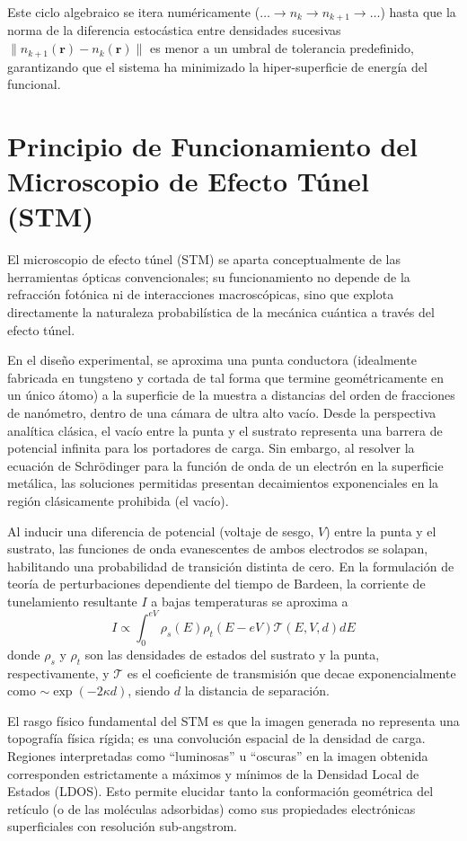 \documentclass[pdflatex,sn-mathphys-num]{sn-jnl}
\theoremstyle{thmstyleone}%
\theoremstyle{thmstyletwo}%
\theoremstyle{thmstylethree}%
\begin{document}
Este ciclo algebraico se itera numéricamente ($\dots \to n_k \to n_{k+1} \to \dots$) hasta que la norma de la diferencia estocástica entre densidades sucesivas $\lVert n_{k+1}(\mathbf{r}) - n_k(\mathbf{r}) \rVert$ es menor a un umbral de tolerancia predefinido, garantizando que el sistema ha minimizado la hiper-superficie de energía del funcional.

\section{Principio de Funcionamiento del Microscopio de Efecto Túnel (STM)}

El microscopio de efecto túnel (STM) se aparta conceptualmente de las
herramientas ópticas convencionales; su funcionamiento no depende de la
refracción fotónica ni de interacciones macroscópicas, sino que explota
directamente la naturaleza probabilística de la mecánica cuántica a través del
efecto túnel.

En el diseño experimental, se aproxima una punta conductora (idealmente
fabricada en tungsteno y cortada de tal forma que termine geométricamente en un
único átomo) a la superficie de la muestra a distancias del orden de fracciones
de nanómetro, dentro de una cámara de ultra alto vacío. Desde la perspectiva
analítica clásica, el vacío entre la punta y el sustrato representa una barrera
de potencial infinita para los portadores de carga. Sin embargo, al resolver la
ecuación de Schrödinger para la función de onda de un electrón en la superficie
metálica, las soluciones permitidas presentan decaimientos exponenciales en la
región clásicamente prohibida (el vacío).

Al inducir una diferencia de potencial (voltaje de sesgo, $V$) entre la punta y
el sustrato, las funciones de onda evanescentes de ambos electrodos se solapan,
habilitando una probabilidad de transición distinta de cero. En la formulación
de teoría de perturbaciones dependiente del tiempo de Bardeen, la corriente de
tunelamiento resultante $I$ a bajas temperaturas se aproxima a
\begin{equation}
    I \propto \int_{0}^{eV} \rho_s(E) \rho_t(E - eV) \mathcal{T}(E, V, d) d E
\end{equation}
donde $\rho_s$ y $\rho_t$ son las densidades de estados del sustrato y la punta,
respectivamente, y $\mathcal{T}$ es el coeficiente de transmisión que decae
exponencialmente como $\sim \exp(-2\kappa d)$, siendo $d$ la distancia de
separación.

El rasgo físico fundamental del STM es que la imagen generada no representa una topografía física rígida; es una convolución espacial de la densidad de carga. Regiones interpretadas como ``luminosas'' u ``oscuras'' en la imagen obtenida
corresponden estrictamente a máximos y mínimos de la Densidad Local de Estados (LDOS). Esto permite elucidar tanto la conformación geométrica del retículo (o de las moléculas adsorbidas) como sus propiedades electrónicas superficiales con resolución sub-angstrom.
\end{document}
